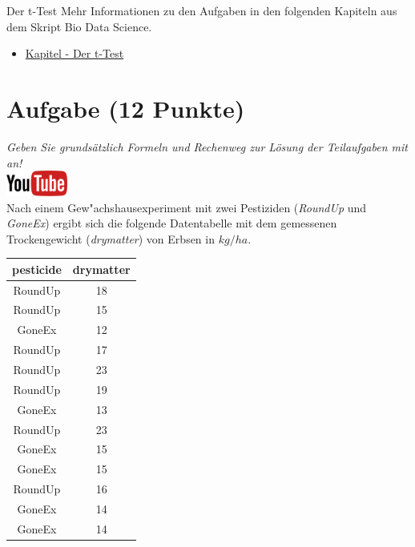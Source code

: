 \documentclass[a4paper, 9pt]{scrartcl}\usepackage[]{graphicx}\usepackage[]{xcolor}
\begin{document}
\clearpage
\begin{graybox}{Der t-Test}
Mehr Informationen zu den Aufgaben in den folgenden Kapiteln aus dem Skript Bio Data Science.
  \begin{itemize}
  \item \href{https://jkruppa.github.io/stat-tests-ttest.html}{Kapitel - Der t-Test}
  \end{itemize}
\end{graybox}
\clearpage

\section{Aufgabe \hfill (12 Punkte)}

\textit{Geben Sie grunds{\"a}tzlich Formeln und Rechenweg zur L{\"o}sung der
  Teilaufgaben mit an!} \\[1Ex]

\hfill\href{https://youtu.be/Cq_rF_z4xOk}{\includegraphics[width =
  2cm]{img/youtube}}\\[1Ex]



Nach einem Gew{"a}chshausexperiment mit zwei Pestiziden (\textit{RoundUp} und
\textit{GoneEx}) ergibt sich die folgende Datentabelle mit dem gemessenen
Trockengewicht (\textit{drymatter}) von Erbsen in $kg/ha$.

\begin{table}[!h]
\centering
\begin{tabular}{cc}
\toprule
pesticide & drymatter\\
\midrule
RoundUp & 18\\
RoundUp & 15\\
GoneEx & 12\\
RoundUp & 17\\
RoundUp & 23\\
\addlinespace
RoundUp & 19\\
GoneEx & 13\\
RoundUp & 23\\
GoneEx & 15\\
GoneEx & 15\\
\addlinespace
RoundUp & 16\\
GoneEx & 14\\
GoneEx & 14\\
\bottomrule
\end{tabular}
\end{table}
\end{document}
